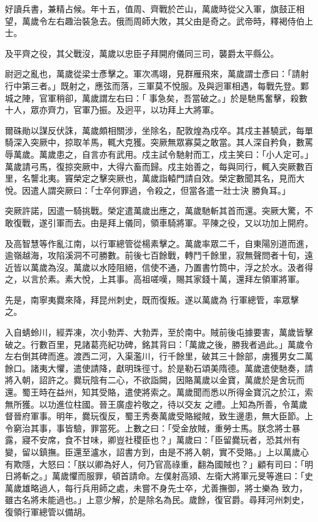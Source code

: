 \begin{pinyinscope}
 好讀兵書，兼精占候。年十五，值周、齊戰於芒山，萬歲時從父入軍，旗鼓正相望，萬歲令左右趣治裝急去。俄而周師大敗，其父由是奇之。武帝時，釋褐侍伯上士。



 及平齊之役，其父戰沒，萬歲以忠臣子拜開府儀同三司，襲爵太平縣公。



 尉迥之亂也，萬歲從梁士彥擊之。軍次馮翊，見群雁飛來，萬歲謂士彥曰：「請射行中第三者。」既射之，應弦而落，三軍莫不悅服。及與迥軍相遇，每戰先登。鄴城之陣，官軍稍卻，萬歲謂左右曰：「
 事急矣，吾當破之。」於是馳馬奮擊，殺數十人，眾亦齊力，官軍乃振。及迥平，以功拜上大將軍。



 爾硃勛以謀反伏誅，萬歲頗相關涉，坐除名，配敦煌為戍卒。其戍主甚驍武，每單騎深入突厥中，掠取羊馬，輒大克獲。突厥無眾寡莫之敢當。其人深自矜負，數罵辱萬歲。萬歲患之，自言亦有武用。戍主試令馳射而工，戍主笑曰：「小人定可。」萬歲請弓馬，復掠突厥中，大得六畜而歸。戍主始善之，每與同行，輒入突厥數百里，名讋北夷。竇榮定之擊突厥也，萬歲詣轅門請自效。榮定數聞其名，見而大悅。因遣人謂突厥曰：「士卒何罪過，令殺之，但當各遣一壯士決
 勝負耳。」



 突厥許諾，因遣一騎挑戰。榮定遣萬歲出應之，萬歲馳斬其首而還。突厥大驚，不敢復戰，遂引軍而去。由是拜上儀同，領車騎將軍。平陳之役，又以功加上開府。



 及高智慧等作亂江南，以行軍總管從楊素擊之。萬歲率眾二千，自東陽別道而進，逾嶺越海，攻陷溪洞不可勝數。前後七百餘戰，轉鬥千餘里，寂無聲問者十旬，遠近皆以萬歲為沒。萬歲以水陸阻絕，信使不通，乃置書竹筒中，浮之於水。汲者得之，以言於素。素大悅，上其事。高祖嗟嘆，賜其家錢十萬，還拜左領軍將軍。



 先是，南寧夷爨來降，拜昆州刺史，既而復叛。遂以萬歲為
 行軍總管，率眾擊之。



 入自蜻蛉川，經弄凍，次小勃弄、大勃弄，至於南中。賊前後屯據要害，萬歲皆擊破之。行數百里，見諸葛亮紀功碑，銘其背曰：「萬歲之後，勝我者過此。」萬歲令左右倒其碑而進。渡西二河，入渠濫川，行千餘里，破其三十餘部，虜獲男女二萬餘口。諸夷大懼，遣使請降，獻明珠徑寸。於是勒石頌美隋德。萬歲遣使馳奏，請將入朝，詔許之。爨玩陰有二心，不欲詣闕，因賂萬歲以金寶，萬歲於是舍玩而還。蜀王時在益州，知其受賂，遣使將索之。萬歲聞而悉以所得金寶沉之於江，索無所獲。以功進位柱國。晉王廣虛衿敬之，待以交友
 之禮。上知為所善，令萬歲督晉府軍事。明年，爨玩復反，蜀王秀奏萬歲受賂縱賊，致生邊患，無大臣節。上令窮治其事，事皆驗，罪當死。上數之曰：「受金放賊，重勞士馬。朕念將士暴露，寢不安席，食不甘味，卿豈社稷臣也？」萬歲曰：「臣留爨玩者，恐其州有變，留以鎮撫。臣還至瀘水，詔書方到，由是不將入朝，實不受賂。」上以萬歲心有欺隱，大怒曰：「朕以卿為好人，何乃官高祿重，翻為國賊也？」顧有司曰：「明日將斬之。」萬歲懼而服罪，頓首請命。左僕射高熲、左衛大將軍元旻等進曰：「史萬歲雄略過人，每行兵用師之處，未嘗不身先士卒，尤善撫御，將士樂為
 致力，雖古名將未能過也。」上意少解，於是除名為民。歲餘，復官爵。尋拜河州刺史，復領行軍總管以備胡。




\end{pinyinscope}
